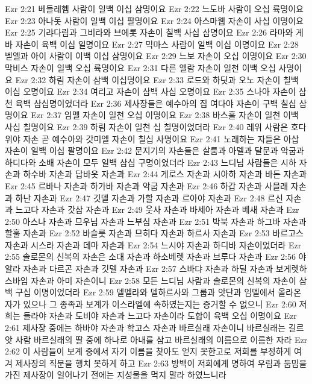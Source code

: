 Ezr 2:21  베들레헴 사람이 일백 이십 삼명이요
Ezr 2:22  느도바 사람이 오십 륙명이요
Ezr 2:23  아나돗 사람이 일백 이십 팔명이요
Ezr 2:24  아스마웹 자손이 사십 이명이요
Ezr 2:25  기랴다림과 그비라와 브에롯 자손이 칠백 사십 삼명이요
Ezr 2:26  라마와 게바 자손이 육백 이십 일명이요
Ezr 2:27  믹마스 사람이 일백 이십 이명이요
Ezr 2:28  벧엘과 아이 사람이 이백 이십 삼명이요
Ezr 2:29  느보 자손이 오십 이명이요
Ezr 2:30  막비스 자손이 일백 오십 륙명이요
Ezr 2:31  다른 엘람 자손이 일천 이백 오십 사명이요
Ezr 2:32  하림 자손이 삼백 이십명이요
Ezr 2:33  로드와 하딧과 오노 자손이 칠백 이십 오명이요
Ezr 2:34  여리고 자손이 삼백 사십 오명이요
Ezr 2:35  스나아 자손이 삼천 육백 삼십명이었더라
Ezr 2:36  제사장들은 예수아의 집 여다야 자손이 구백 칠십 삼명이요
Ezr 2:37  임멜 자손이 일천 오십 이명이요
Ezr 2:38  바스훌 자손이 일천 이백 사십 칠명이요
Ezr 2:39  하림 자손이 일천 십 칠명이었더라
Ezr 2:40  레위 사람은 호다위야 자손 곧 예수아와 갓미엘 자손이 칠십 사명이요
Ezr 2:41  노래하는 자들은 아삽 자손이 일백 이십 팔명이요
Ezr 2:42  문지기의 자손들은 살룸과 아델과 달문과 악굽과 하디다와 소배 자손이 모두 일백 삼십 구명이었더라
Ezr 2:43  느디님 사람들은 시하 자손과 하수바 자손과 답바옷 자손과
Ezr 2:44  게로스 자손과 시아하 자손과 바돈 자손과
Ezr 2:45  르바나 자손과 하가바 자손과 악굽 자손과
Ezr 2:46  하갑 자손과 사믈래 자손과 하난 자손과
Ezr 2:47  깃델 자손과 가할 자손과 르아야 자손과
Ezr 2:48  르신 자손과 느고다 자손과 갓삼 자손과
Ezr 2:49  웃사 자손과 바세아 자손과 베새 자손과
Ezr 2:50  아스나 자손과 므우님 자손과 느부심 자손과
Ezr 2:51  박북 자손과 하그바 자손과 할훌 자손과
Ezr 2:52  바슬룻 자손과 므히다 자손과 하르사 자손과
Ezr 2:53  바르고스 자손과 시스라 자손과 데마 자손과
Ezr 2:54  느시야 자손과 하디바 자손이었더라
Ezr 2:55  솔로몬의 신복의 자손은 소대 자손과 하소베렛 자손과 브루다 자손과
Ezr 2:56  야알라 자손과 다르곤 자손과 깃델 자손과
Ezr 2:57  스바댜 자손과 하딜 자손과 보게렛하스바임 자손과 아미 자손이니
Ezr 2:58  모든 느디님 사람과 솔로몬의 신복의 자손이 삼백 구십 이명이었더라
Ezr 2:59  델멜라와 델하르사와 그룹과 앗단과 임멜에서 올라온 자가 있으나 그 종족과 보계가 이스라엘에 속하였는지는 증거할 수 없으니
Ezr 2:60  저희는 들라야 자손과 도비야 자손과 느고다 자손이라 도합이 육백 오십 이명이요
Ezr 2:61  제사장 중에는 하바야 자손과 학고스 자손과 바르실래 자손이니 바르실래는 길르앗 사람 바르실래의 딸 중에 하나로 아내를 삼고 바르실래의 이름으로 이름한 자라
Ezr 2:62  이 사람들이 보계 중에서 자기 이름을 찾아도 얻지 못한고로 저희를 부정하게 여겨 제사장의 직분을 행치 못하게 하고
Ezr 2:63  방백이 저희에게 명하여 우림과 둠밈을 가진 제사장이 일어나기 전에는 지성물을 먹지 말라 하였느니라
